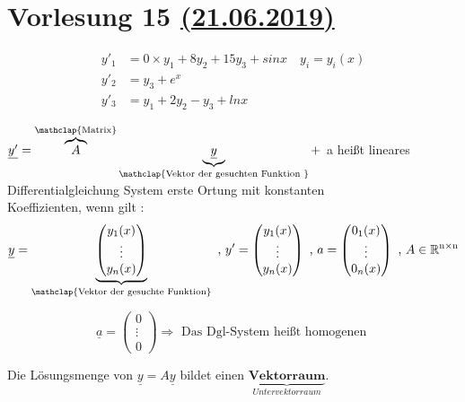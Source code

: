 \section{Vorlesung 15 \href{https://tu-dresden.de/mn/math/algebra/das-institut/beschaeftigte/antje-noack/ressourcen/dateien/v120-1/MathMethInf15.pdf?lang=en}{(21.06.2019)}}
\begin{example}
\begin{align*}
y'_1 &= 0 \times y_1 + 8 y_2 + 15 y_3 + sinx \quad y_i = y_i(x)\\
y'_2 &= y_3 + e^x\\
y'_3 &= y_1 + 2 y_2 - y_3 + lnx 
\end{align*}
\end{example}
\begin{definition}
$\underline{y'} =\overbrace{A}^{\mathclap{\text{Matrix}}}\underbrace{\underline{y}}_{\mathclap{\text{Vektor der gesuchten Funktion }}} +$ a heißt lineares Differentialgleichung System erste Ortung mit konstanten\\
Koeffizienten, wenn gilt :
\begin{gather*}
\underline{y} =\underbrace{\begin{pmatrix}
y_1(x)\\
\vdots\\
y_n(x)
\end{pmatrix}}_{\mathclap{\text{Vektor der gesuchte Funktion}}} \text{ , } 
y' = \begin{pmatrix}
y_1(x)\\
\vdots\\
y_n(x)
\end{pmatrix}
\text{ , } 
a = \begin{pmatrix}
0_1(x)\\
\vdots\\
0_n(x)
\end{pmatrix}
\text{ , }
A \in \mathbb{R^{\text{n} \times \text{n}}}
\end{gather*}
\end{definition}
\begin{remark}
\[ \underline{a} = \begin{pmatrix}
0\\
\vdots\\
0
\end{pmatrix} \Rightarrow \text{ Das Dgl-System heißt homogenen }  \]
\end{remark}
\begin{remark}
Die Lösungsmenge von $\underline{y} = A \underline{y}$ bildet einen $\underbrace{\textbf{Vektorraum}}_{Untervektorraum}$.
\end{remark}
